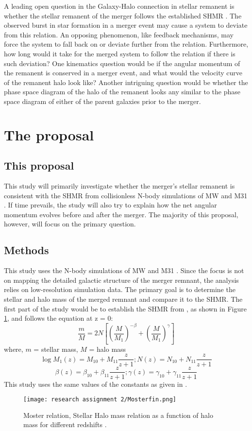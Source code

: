 \documentclass[twocolumn]{aastex631}
\begin{document}
A leading open question in the Galaxy-Halo connection in stellar remanent is whether the stellar remanent of the merger follows the established SHMR \citep{Moster+2013}. The observed burst in star formation in a merger event may cause a system to deviate from this relation\citep{Hopkins+2010}. An opposing phenomenon, like feedback mechanisms, may force the system to fall back on or deviate further from the relation. Furthermore, how long would it take for the merged system to follow the relation if there is such deviation? One kinematics question would be if the angular momentum of the remanent is conserved in a merger event, and what would the velocity curve of the remanent halo look like? Another intriguing question would be whether the phase space diagram of the halo of the remanent looks any similar to the phase space diagram of either of the parent galaxies prior to the merger.

\section{The proposal}
\subsection{This proposal}
This study will primarily investigate whether the merger's stellar remanent is consistent with the SHMR from collisionless N-body simulations of MW and M31 \citep{Marel+2012}. If time prevails, the study will also try to explain how the net angular momentum evolves before and after the merger. The majority of this proposal, however, will focus on the primary question.

\subsection{Methods}
This study uses the N-body simulations of MW and M31 \citep{Marel+2012}. Since the focus is not on mapping the detailed galactic structure of the merger remnant, the analysis relies on low-resolution simulation data. The primary goal is to determine the stellar and halo mass of the merged remnant and compare it to the 
SHMR. The first part of the study would be to establish the SHMR from \citet{Moster+2013}, as shown in Figure \ref{Moster}, and follows the equation at z = 0:
$$\frac{m}{M} = 2N \left [ \left ( \frac{M}{M_1} \right)^{-\beta} + \left (\frac{M}{M_1} \right)^{\gamma} \right]$$
where, $m$ = stellar mass, $M$ = halo mass
$$\log M_1(z) = M_{10} + M_{11} \frac{z}{z+1}; N(z) = N_{10} + N_{11} \frac{z}{z+1}$$
$$\beta(z) = \beta_{10} + \beta_{11} \frac{z}{z+1}; \gamma(z) = \gamma_{10} + \gamma_{11} \frac{z}{z+1}$$
This study uses the same values of the constants as given in \citet{Moster+2013}.
\begin{figure}
    \centering
    \texttt{[image: research assignment 2/Mosterfin.png]}
    \caption{Moster relation, Stellar Halo mass relation as a function of halo mass for different redshifts \citep{Moster+2013}.}
    \label{Moster}
\end{figure}
\end{document}
